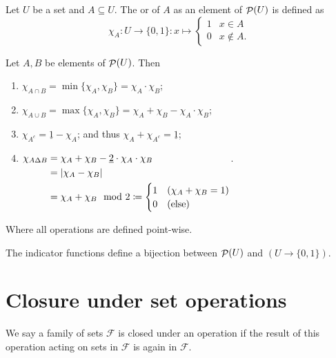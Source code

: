 \begin{definition}
Let $U$ be a set and $A\subseteq U$. The  or  of $A$ as an element of $\mathop{\mathcal{P}}(U)$ is defined as
\[ \chi_A: U\to \{0,1\}: x\mapsto \begin{cases}
1 & x\in A \\ 0 & x\notin A.
\end{cases} \]
\end{definition}
\begin{lemma}
Let $A,B$ be elements of $\mathop{\mathcal{P}}(U)$. Then
\begin{enumerate}
\item $\chi_{A\cap B} = \min\{\chi_A,\chi_B\} = \chi_A\cdot \chi_B$;
\item $\chi_{A\cup B} = \max\{\chi_A,\chi_B\} = \chi_A + \chi_B - \chi_A\cdot \chi_B$;
\item $\chi_{A^c} = \underline{1}-\chi_A$; and thus $\chi_A + \chi_{A^c} = \underline{1}$;
\item $\chi_{A\Delta B} \begin{aligned}[t] &= \chi_A + \chi_B - \underline{2}\cdot\chi_A\cdot \chi_B \\
&= |\chi_A - \chi_B| \\
&= \chi_A + \chi_B \mod 2 \coloneqq \begin{cases}
1 & (\chi_A + \chi_B = 1) \\
0 & \text{(else)}
\end{cases}
\end{aligned}$.
\end{enumerate}
Where all operations are defined point-wise.
\end{lemma}

\begin{proposition}
The indicator functions define a bijection between $\mathop{\mathcal{P}}(U)$ and $(U\to \{0,1\})$.
\end{proposition}

\section{Closure under set operations}
We say a family of sets $\mathcal{F}$ is closed under an operation if the result of this operation acting on sets in $\mathcal{F}$ is again in $\mathcal{F}$.

